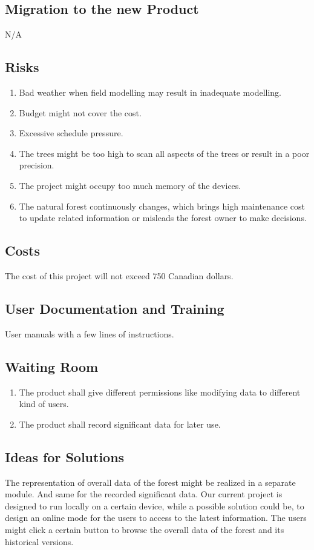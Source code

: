 \documentclass{article}
\begin{document}
\subsection{Migration to the new Product}
N/A
\subsection{Risks}
\begin{enumerate}
    \item Bad weather when field modelling may result in inadequate modelling.
    \item Budget might not cover the cost.
    \item Excessive schedule pressure.
    \item The trees might be too high to scan all aspects of the trees or result in a poor precision.
    \item The project might occupy too much memory of the devices.
    \item The natural forest continuously changes, which brings high maintenance cost to update related information or misleads the forest owner to make decisions. 
\end{enumerate}
\subsection{Costs}
The cost of this project will not exceed 750 Canadian dollars.
\subsection{User Documentation and Training}
User manuals with a few lines of instructions. 
\subsection{Waiting Room}
\begin{enumerate}
    \item The product shall give different permissions like modifying data to different kind of users.
    \item The product shall record significant data for later use.
\end{enumerate}
\subsection{Ideas for Solutions}
The representation of overall data of the forest might be realized in a separate module. And same for the recorded significant data. Our current project is designed to run locally on a certain device, while a possible solution could be, to design an online mode for the users to access to the latest information. The users might click a certain button to browse the overall data of the forest and its historical versions. 

\end{document}
